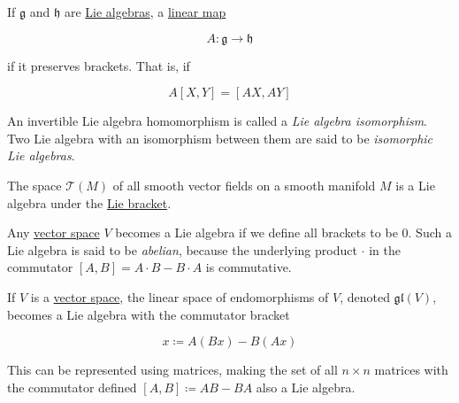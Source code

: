 \documentclass{article}
\newcounter{definition}[section]
\newcounter{example}[section]
\begin{document}
    \begin{definition}
      \label{def:lie-algebra-homomorphism-and-isomorphism}
      If $\mathfrak{g}$ and $\mathfrak{h}$ are \hyperref[def:lie-algebra]{Lie algebras}, a \hyperref[lin-def:linear_map]{linear map} 

        \begin{equation}
          A: \mathfrak{g} \to \mathfrak{h}
        \end{equation}

      if it preserves brackets. That is, if 

        \begin{equation}
          A[X, Y] = [AX, AY]
        \end{equation}

      An invertible Lie algebra homomorphism is called a \textit{Lie algebra isomorphism}. Two Lie algebra with an isomorphism between them are said to be \textit{isomorphic Lie algebras}. 
    \end{definition}

    \begin{example}
      \label{ex:vector-fields-as-a-lie-algebra}
      The space $\mathcal{T}(M)$ of all smooth vector fields on a smooth manifold $M$ is a Lie algebra under the \hyperref[def:lie-bracket]{Lie bracket}. 
    \end{example}

    \begin{example}
      \label{ex:abelian-lie-algebra}
      Any \hyperref[lin-def:vector-space]{vector space} $V$ becomes a Lie algebra if we define all brackets to be $0$. Such a Lie algebra is said to be \textit{abelian}, because the underlying product $\cdot$ in the commutator $[A,B] = A \cdot B - B \cdot A$ is commutative. 
    \end{example}

    \begin{example}
      \label{ex:the-general-linear-lie-algebra-mathfrakglv}
      If $V$ is a \hyperref[lin-def:vector-space]{vector space}, the linear space of endomorphisms of $V$, denoted $\mathfrak{gl}(V)$, becomes a Lie algebra with the commutator bracket

        \begin{equation}
          [A,B] x \coloneqq A (Bx) - B (Ax)
        \end{equation}

      This can be represented using matrices, making the set of all $n \times n$ matrices with the commutator defined $[A,B] \coloneqq A B - B A$ also a Lie algebra. 
    \end{example}
\end{document}
